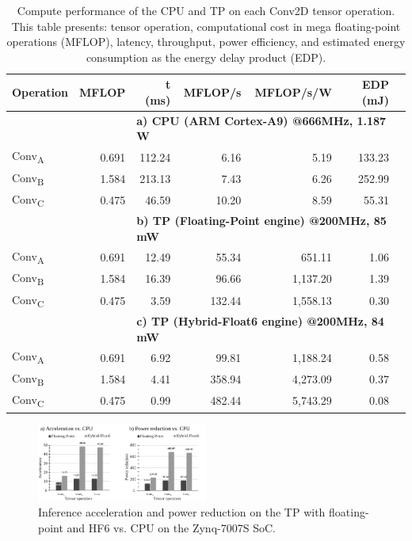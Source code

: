 \begin{table}[!t]\centering
	\caption{Compute performance of the CPU and TP on each Conv2D tensor operation. This table presents: tensor operation, computational cost in mega floating-point operations (MFLOP), latency, throughput, power efficiency, and estimated energy consumption as the energy delay product (EDP).}\label{tab:performance}
	\scriptsize
	\begin{tabular}{lrrrrrr}\toprule
		\textbf{Operation} &\textbf{MFLOP} &\textbf{t (ms)} &\textbf{MFLOP/s} &\textbf{MFLOP/s/W} &\textbf{EDP (mJ)} \\\midrule
		& &\multicolumn{4}{l}{\textbf{a) CPU (ARM Cortex-A9) @666MHz, 1.187 W}} \\
		Conv\textsubscript{A} &0.691 &112.24 &6.16 &5.19 &133.23 \\
		Conv\textsubscript{B} &1.584 &213.13 &7.43 &6.26 &252.99 \\
		Conv\textsubscript{C} &0.475 &46.59 &10.20 &8.59 &55.31 \\
		& &\multicolumn{4}{l}{\textbf{b) TP (Floating-Point engine) @200MHz, 85 mW}} \\
		Conv\textsubscript{A} &0.691 &12.49 &55.34 &651.11 &1.06 \\
		Conv\textsubscript{B} &1.584 &16.39 &96.66 &1,137.20 &1.39 \\
		Conv\textsubscript{C} &0.475 &3.59 &132.44 &1,558.13 &0.30 \\
		& &\multicolumn{4}{l}{\textbf{c) TP (Hybrid-Float6 engine) @200MHz, 84 mW}} \\
		Conv\textsubscript{A} &0.691 &6.92 &99.81 &1,188.24 &0.58 \\
		Conv\textsubscript{B} &1.584 &4.41 &358.94 &4,273.09 &0.37 \\
		Conv\textsubscript{C} &0.475 &0.99 &482.44 &5,743.29 &0.08 \\
		\bottomrule
	\end{tabular}
\end{table}

\begin{figure}[t!]
	\centering
	\includegraphics[width=0.5\textwidth]{./chapters/cnn_accelerator/figures/power_breakdown/acceleration_power_reduction.pdf}
	\caption{Inference acceleration and power reduction on the TP with floating-point and HF6 vs. CPU on the Zynq-7007S SoC.}
	\label{fig:acceleration}
\end{figure}


